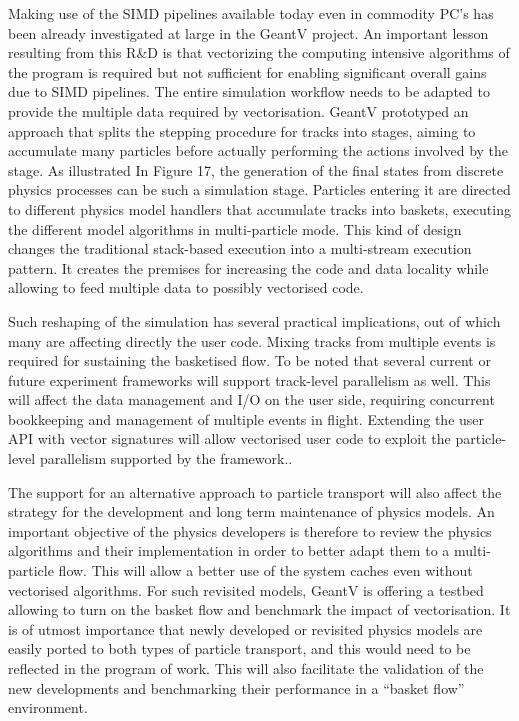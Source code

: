 \documentclass[12pt,a4paper]{article}
\begin{document}
{Making use of the SIMD pipelines available today even in commodity PC's
has been already investigated at large in the GeantV project. An
important lesson resulting from this R\&D is that vectorizing the
computing intensive algorithms of the program is required but not
sufficient for enabling significant overall gains due to SIMD pipelines.
The entire simulation workflow needs to be adapted to provide the
multiple data required by vectorisation. GeantV prototyped an approach
that splits the stepping procedure for tracks into stages, aiming to
accumulate many particles before actually performing the actions
involved by the stage. As illustrated In Figure 17, the generation of
the final states from discrete physics processes can be such a
simulation stage. Particles entering it are directed to different
physics model handlers that accumulate tracks into baskets, executing
the different model algorithms in multi-particle mode. This kind of
design changes the traditional stack-based execution into a multi-stream
execution pattern. It creates the premises for increasing the code and
data locality while allowing to feed multiple data to possibly
vectorised code.

Such reshaping of the simulation has several practical implications, out
of which many are affecting directly the user code. Mixing tracks from
multiple events is required for sustaining the basketised flow. To be
noted that several current or future experiment frameworks will support
track-level parallelism as well. This will affect the data management
and I/O on the user side, requiring concurrent bookkeeping and
management of multiple events in flight. Extending the user API with
vector signatures will allow vectorised user code to exploit the
particle-level parallelism supported by the framework..

The support for an alternative approach to particle transport will also
affect the strategy for the development and long term maintenance of
physics models. An important objective of the physics developers is
therefore to review the physics algorithms and their implementation in
order to better adapt them to a multi-particle flow. This will allow a
better use of the system caches even without vectorised algorithms. For
such revisited models, GeantV is offering a testbed allowing to turn on
the basket flow and benchmark the impact of vectorisation. It is of
utmost importance that newly developed or revisited physics models are
easily ported to both types of particle transport, and this would need
to be reflected in the program of work. This will also facilitate the
validation of the new developments and benchmarking their performance in
a ``basket flow'' environment.

}
\end{document}
